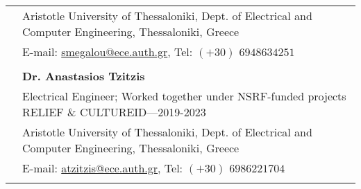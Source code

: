 \documentclass[a4paper,10pt,twoside]{article}
\begin{document}
\begin{tabular}{rp{14cm}}
&Aristotle University of Thessaloniki, Dept. of Electrical and Computer Engineering, Thessaloniki, Greece \\
& E-mail: \href{mailto: smegalou@ece.auth.gr}{smegalou@ece.auth.gr}, Tel: $(+30)$ $694 863 4251$ \\
&\\
& \textbf{Dr. Anastasios Tzitzis} \\
& {Electrical Engineer; Worked together under NSRF-funded projects RELIEF \& CULTUREID}---2019-2023\\
&Aristotle University of Thessaloniki, Dept. of Electrical and Computer Engineering, Thessaloniki, Greece \\
& E-mail: \href{mailto: atzitzis@ece.auth.gr}{atzitzis@ece.auth.gr}, Tel: $(+30)$ $698 622 1704$ \\
&\\

\end{tabular}
\end{document}
